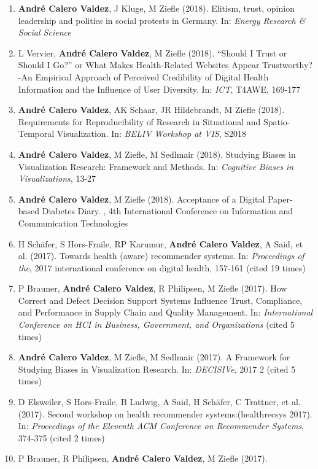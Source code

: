 \documentclass[11pt,a4paper,sans]{moderncv}
\begin{document}
\begin{enumerate}
\item
  \textbf{André Calero Valdez}, J Kluge, M Ziefle (2018). Elitism,
  trust, opinion leadership and politics in social protests in Germany.
  In: \emph{Energy Research \& Social Science}
\item
  L Vervier, \textbf{André Calero Valdez}, M Ziefle (2018). ``Should I
  Trust or Should I Go?'' or What Makes Health-Related Websites Appear
  Trustworthy?-An Empirical Approach of Perceived Credibility of Digital
  Health Information and the Influence of User Diversity. In:
  \emph{ICT}, T4AWE, 169-177
\item
  \textbf{André Calero Valdez}, AK Schaar, JR Hildebrandt, M Ziefle
  (2018). Requirements for Reproducibility of Research in Situational
  and Spatio-Temporal Visualization. In: \emph{BELIV Workshop at VIS},
  S2018
\item
  \textbf{André Calero Valdez}, M Ziefle, M Sedlmair (2018). Studying
  Biases in Visualization Research: Framework and Methods. In:
  \emph{Cognitive Biases in Visualizations}, 13-27
\item
  \textbf{André Calero Valdez}, M Ziefle (2018). Acceptance of a Digital
  Paper-based Diabetes Diary. , 4th International Conference on
  Information and Communication Technologies~
\item
  H Schäfer, S Hors-Fraile, RP Karumur, \textbf{André Calero Valdez}, A
  Said, et al. (2017). Towards health (aware) recommender systems. In:
  \emph{Proceedings of the}, 2017 international conference on digital
  health, 157-161 (cited 19 times)
\item
  P Brauner, \textbf{André Calero Valdez}, R Philipsen, M Ziefle (2017).
  How Correct and Defect Decision Support Systems Influence Trust,
  Compliance, and Performance in Supply Chain and Quality Management.
  In: \emph{International Conference on HCI in Business, Government, and
  Organizations} (cited 5 times)
\item
  \textbf{André Calero Valdez}, M Ziefle, M Sedlmair (2017). A Framework
  for Studying Biases in Visualization Research. In: \emph{DECISIVe},
  2017 2 (cited 5 times)
\item
  D Elsweiler, S Hors-Fraile, B Ludwig, A Said, H Schäfer, C Trattner,
  et al. (2017). Second workshop on health recommender
  systems:(healthrecsys 2017). In: \emph{Proceedings of the Eleventh ACM
  Conference on Recommender Systems}, 374-375 (cited 2 times)
\item
  P Brauner, R Philipsen, \textbf{André Calero Valdez}, M Ziefle (2017).

\end{enumerate}
\end{document}
